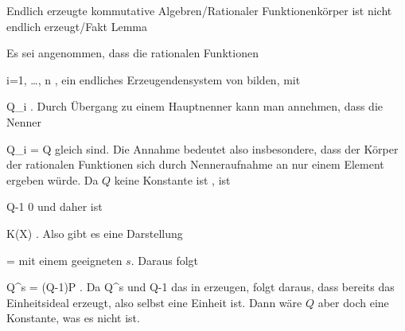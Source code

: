 {Endlich erzeugte kommutative Algebren/Rationaler Funktionenkörper ist nicht endlich erzeugt/Fakt}
{Lemma}
{}
{



\faktsituation {}
\faktzusatz {}
\faktzusatz {}





}
{





Es sei angenommen, dass die rationalen Funktionen

 {}
 {i=1, \ldots , n} {}
 {} {} {} {,}
ein endliches Erzeugendensystem von
 bilden, mit

 {}
 {Q_i } {}
 {} {} {} {.}
Durch Übergang zu einem Hauptnenner kann man annehmen, dass die Nenner

\mavergleichskette
{\vergleichskette
{Q_i
}
{ = }{ Q
}
{  }{
}
{    }{
}
{   }{
}
}
{}{}{}
gleich sind. Die Annahme bedeutet also insbesondere, dass der Körper der rationalen Funktionen sich durch Nenneraufnahme an nur einem Element ergeben würde. Da $Q$ keine Konstante ist
 {} {,}
ist

\mavergleichskette
{\vergleichskette
{Q-1
}
{ \neq }{ 0
}
{  }{
}
{    }{
}
{   }{
}
}
{}{}{}
und daher ist

\mavergleichskette
{\vergleichskette
{ 
}
{ \in }{ K(X)
}
{  }{
}
{    }{
}
{   }{
}
}
{}{}{.}
Also gibt es eine Darstellung

\mavergleichskettedisp
{\vergleichskette
{ 
}
{ =} { 
}
{ } {
}
{ } {
}
{ } {
}
}
{}{}{}
mit einem geeigneten $s$. Daraus folgt

\mavergleichskette
{\vergleichskette
{Q^s
}
{ = }{ (Q-1)P
}
{  }{
}
{    }{
}
{   }{
}
}
{}{}{.}
Da
\mathkor {} {Q^s} {und} {Q-1} {}
das
in
 erzeugen, folgt daraus, dass bereits
 das Einheitsideal erzeugt, also selbst eine Einheit ist. Dann wäre $Q$ aber doch eine Konstante, was es nicht ist.




}



